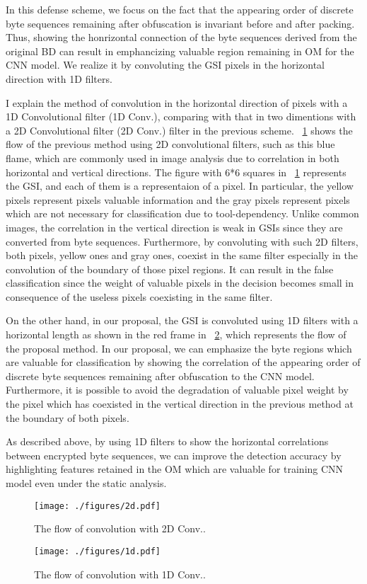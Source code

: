 In this defense scheme, we focus on the fact that the appearing order of discrete byte sequences remaining after obfuscation is invariant before and after packing.
Thus, showing the honrizontal connection of the byte sequences derived from the original BD can result in emphancizing valuable region remaining in OM for the CNN model.
We realize it by convoluting the GSI pixels in the horizontal direction with 1D filters.

I explain the method of convolution in the horizontal direction of pixels with a 1D Convolutional filter (1D Conv.), comparing with that in two dimentions with a 2D Convolutional filter (2D Conv.) filter in the previous scheme.
\figurename~\ref{fig:2d} shows the flow of the previous method using 2D convolutional filters, such as this blue flame, which are commonly used in image analysis due to correlation in both horizontal and vertical directions.
The figure with 6*6 squares in \figurename~\ref{fig:2d} represents the GSI, and each of them is a representaion of a pixel.
In particular, the yellow pixels represent pixels valuable information and the gray pixels represent pixels which are not necessary for classification due to tool-dependency.
Unlike common images, the correlation in the vertical direction is weak in GSIs since they are converted from byte sequences.
Furthermore, by convoluting with such 2D filters, both pixels, yellow ones and gray ones, coexist in the same filter especially in the convolution of the boundary of those pixel regions.
It can result in the false classification since the weight of valuable pixels in the decision becomes small in consequence of the useless pixels coexisting in the same filter.

On the other hand, in our proposal, the GSI is convoluted using 1D filters with a horizontal length as shown in the red frame in \figurename~\ref{fig:1d}, which represents the flow of the proposal method.
In our proposal, we can emphasize the byte regions which are valuable for classification by showing the correlation of the appearing order of discrete byte sequences remaining after obfuscation to the CNN model.
Furthermore, it is possible to avoid the degradation of valuable pixel weight by the pixel which has coexisted in the vertical direction in the previous method at the boundary of both pixels.

As described above, by using 1D filters to show the horizontal correlations between encrypted byte sequences, we can improve the detection accuracy by highlighting features retained in the OM which are valuable for training CNN model even under the static analysis.

\begin{figure}[h]
 \centering
 \texttt{[image: ./figures/2d.pdf]}
 \caption{The flow of convolution with 2D Conv..} 
 \label{fig:2d}
\end{figure}
\begin{figure}[h]
 \centering
 \texttt{[image: ./figures/1d.pdf]}
 \caption{The flow of convolution with 1D Conv..} 
 \label{fig:1d}
\end{figure}
\afterpage{\clearpage}
\newpage

